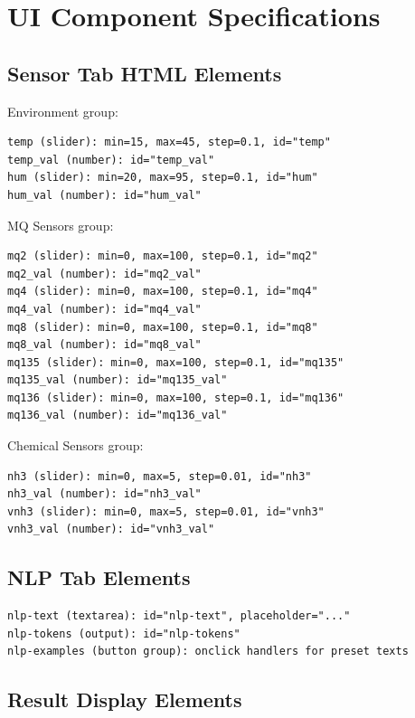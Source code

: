 \documentclass[12pt,a4paper]{article}
\begin{document}
\section{UI Component Specifications}

\subsection{Sensor Tab HTML Elements}

Environment group:
\begin{verbatim}
temp (slider): min=15, max=45, step=0.1, id="temp"
temp_val (number): id="temp_val"
hum (slider): min=20, max=95, step=0.1, id="hum"
hum_val (number): id="hum_val"
\end{verbatim}

MQ Sensors group:
\begin{verbatim}
mq2 (slider): min=0, max=100, step=0.1, id="mq2"
mq2_val (number): id="mq2_val"
mq4 (slider): min=0, max=100, step=0.1, id="mq4"
mq4_val (number): id="mq4_val"
mq8 (slider): min=0, max=100, step=0.1, id="mq8"
mq8_val (number): id="mq8_val"
mq135 (slider): min=0, max=100, step=0.1, id="mq135"
mq135_val (number): id="mq135_val"
mq136 (slider): min=0, max=100, step=0.1, id="mq136"
mq136_val (number): id="mq136_val"
\end{verbatim}

Chemical Sensors group:
\begin{verbatim}
nh3 (slider): min=0, max=5, step=0.01, id="nh3"
nh3_val (number): id="nh3_val"
vnh3 (slider): min=0, max=5, step=0.01, id="vnh3"
vnh3_val (number): id="vnh3_val"
\end{verbatim}

\subsection{NLP Tab Elements}

\begin{verbatim}
nlp-text (textarea): id="nlp-text", placeholder="..."
nlp-tokens (output): id="nlp-tokens"
nlp-examples (button group): onclick handlers for preset texts
\end{verbatim}

\subsection{Result Display Elements}
\end{document}
